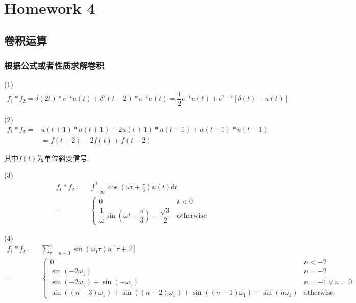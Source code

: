 
\section{Homework 4}

\subsection{卷积运算}

\subsubsection{根据公式或者性质求解卷积}

(1) 
\begin{align*}
    f_1*f_2=\delta(2t)*e^{-t}u(t)+\delta'(t-2)*e^{-t}u(t)=\dfrac{1}{2}e^{-t}u(t)+e^{2-t}[\delta(t)-u(t)]
\end{align*}

(2) 
\begin{align*}
    f_1*f_2=&u(t+1)*u(t+1)-2u(t+1)*u(t-1)+u(t-1)*u(t-1)  \\
    &=f(t+2)-2f(t)+f(t-2)
\end{align*}

其中$f(t)$为单位斜变信号.

(3)
\begin{align*}
    f_1*f_2=&\displaystyle\int_{-\infty}^{t}\cos(\omega t + \frac{\pi}{3})u(t)\mathrm{d}t \\
    =&\left\{
        \begin{array}{ll}
            0 & t < 0 \\
            \dfrac{1}{\omega}\sin(\omega t+\dfrac{\pi}{3})-\dfrac{\sqrt{3}}{2} & \text{otherwise}
        \end{array}
    \right.
\end{align*}

(4) 
\begin{align*}
    f_1*f_2=&\displaystyle\sum_{\tau=n-3}^{n}\sin(\omega_1\tau)u[\tau+2] \\
    =&\left\{\begin{array}{ll}
        0 & n < -2 \\
        \sin(-2\omega_1) & n = -2 \\
        \sin(-2\omega_1)+\sin(-\omega_1) & n = -1 \lor n = 0 \\
        \sin((n-3)\omega_1)+\sin((n-2)\omega_1)+\sin((n-1)\omega_1)+\sin(n\omega_1) & \text{otherwise}
    \end{array}\right.
\end{align*}
